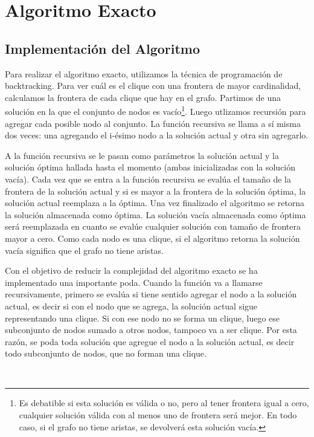 \section{Algoritmo Exacto}

{\color{dGray}\subsection{Implementación del Algoritmo}

\par{Para realizar el algoritmo exacto, utilizamos la técnica de programación de
backtracking. Para ver cuál es el clique con una frontera de mayor
cardinalidad, calculamos la frontera de cada clique que hay en el grafo.
Partimos de una solución en la que el conjunto de nodos es vacío\footnote{{
\color{dGray}Es debatible si esta solución es válida o no, pero al tener
frontera igual a cero, cualquier solución válida con al menos uno de frontera
será mejor. En todo caso, si el grafo no tiene aristas, se devolverá esta
solución vacía.}}. Luego utlizamos recursión para agregar cada posible nodo al
conjunto. La función recursiva se llama a sí misma dos veces: una agregando el
i-ésimo nodo a la solución actual y otra sin agregarlo.}\\

\par{A la función recursiva se le pasan como parámetros la solución actual y
la solución óptima hallada hasta el momento (ambas inicializadas con la
solución vacía). Cada vez que se entra a la función recursiva se evalúa el
tamaño de la frontera de la solución actual y si es mayor a la frontera de
la solución óptima, la solución actual reemplaza a la óptima. Una vez
finalizado el algoritmo se retorna la solución almacenada como óptima. La
solución vacía almacenada como óptima será reemplazada en cuanto se evalúe
cualquier solución con tamaño de frontera mayor a cero. Como cada nodo es una
clique, si el algoritmo retorna la solución vacía significa que el grafo no
tiene aristas.}\\

\par{Con el objetivo de reducir la complejidad del algoritmo exacto se ha
implementado una importante poda. Cuando la función va a llamarse
recursivamente, primero se evalúa si tiene sentido agregar el nodo a la
solución actual, es decir si con el nodo que se agrega, la solución actual
sigue representando una clique. Si con ese nodo no se
forma un clique, luego ese subconjunto de nodos sumado a otros nodos, tampoco
va a ser clique. Por esta razón, se poda toda solución que agregue el nodo
a la solución actual, es decir todo subconjunto de nodos, que no forman una
clique.}}\\

